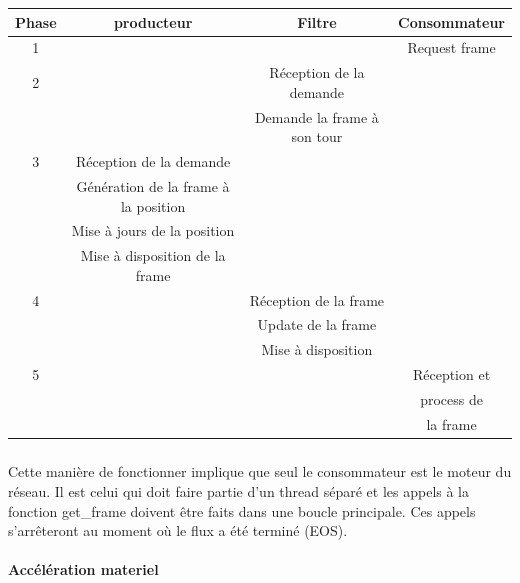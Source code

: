 \begin{center}

  \begin{tabular}{ | c | c | c | c |}

    \hline

Phase & producteur & Filtre & Consommateur    \\ \hline \hline

1 & & & Request frame   \\ \hline

2 & & Réception de la demande & \\

  & & Demande la frame à son tour & \\ \hline


3 & Réception de la demande & & \\

  & Génération de la frame à la position & & \\

  & Mise à jours de la position & & \\

  & Mise à disposition de la frame & & \\ \hline

4 & & Réception de la frame       & \\

  & & Update de la frame & \\

  & & Mise à disposition & \\ \hline

5 & & & Réception et    \\

  & & & process de      \\

  & & & la frame        \\ \hline

  \end{tabular}

\end{center}

\subparagraph{}

Cette manière de fonctionner implique que seul le consommateur est
le moteur du réseau. Il est celui qui doit faire partie d'un thread
séparé et les appels à la fonction get\_frame doivent être faits
dans une boucle principale.  Ces appels s'arrêteront au moment où le
flux a été terminé (EOS).


\paragraph{Accélération materiel}


